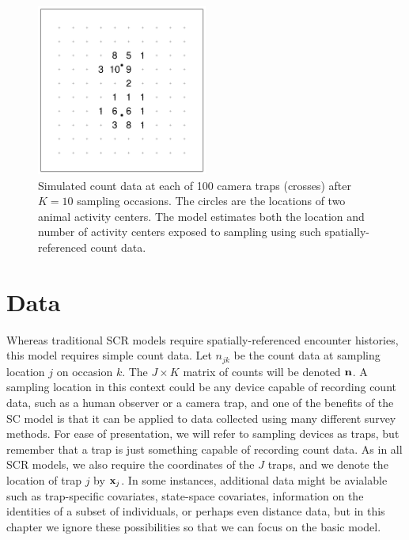\begin{figure}%
\centering
\includegraphics[width=0.5\textwidth]{Ch18-Unmarked/figs/heuristic}
\caption{Simulated count data at each of 100 camera traps
  (crosses) after $K=10$ sampling occasions. The circles are the
  locations of two animal activity centers. The
  \citet{chandler_royle:2012} model estimates %
  both the location and number of activity centers exposed to
  sampling using such spatially-referenced count data.}
\label{chapt-unmarked.fig.heur}
\end{figure}





\section{Data}

Whereas traditional SCR models require spatially-referenced
encounter histories, this model requires simple count data.
Let $n_{jk}$ be the count data at sampling location $j$ %
on occasion $k$. %
The $J \times K$ matrix of
counts will be denoted $\bf{n}$. A sampling location in this context
could be any device capable of recording count data, such as a
human observer or a camera trap, and
one of the benefits of the SC model is that it
can be applied to data collected using many different survey
methods. For ease of presentation, we will refer to sampling devices
as traps, but remember that a trap is just something capable of
recording count data. As in all SCR models, we also require the
coordinates of the $J$ traps, and we denote the location of trap $j$
by ${\bf x}_j$. In some instances, additional data might be avialable such as
trap-specific covariates, state-space covariates,
information on the identities of a subset of individuals, or perhaps
even distance data, but in this chapter we ignore these %
possibilities so that we can focus on the basic model.

